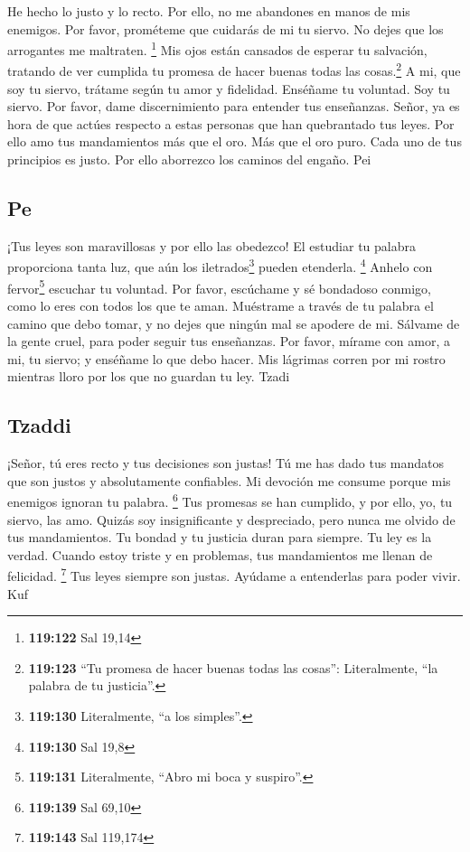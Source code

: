  He hecho lo justo y lo recto. Por ello, no me abandones
en manos de mis enemigos.  Por favor, prométeme que
cuidarás de mi tu siervo. No dejes que los arrogantes me maltraten.
\footnote{\textbf{119:122} Sal 19,14}  Mis ojos están
cansados de esperar tu salvación, tratando de ver cumplida tu promesa de
hacer buenas todas las cosas.\footnote{\textbf{119:123} ``Tu promesa de
  hacer buenas todas las cosas'': Literalmente, ``la palabra de tu
  justicia''.}  A mi, que soy tu siervo, trátame según
tu amor y fidelidad. Enséñame tu voluntad.  Soy tu
siervo. Por favor, dame discernimiento para entender tus enseñanzas.
 Señor, ya es hora de que actúes respecto a estas
personas que han quebrantado tus leyes.  Por ello amo
tus mandamientos más que el oro. Más que el oro puro. 
Cada uno de tus principios es justo. Por ello aborrezco los caminos del
engaño. Pei

\hypertarget{pe}{%
\subsection{Pe}\label{pe}}

 ¡Tus leyes son maravillosas y por ello las obedezco!
 El estudiar tu palabra proporciona tanta luz, que aún
los iletrados\footnote{\textbf{119:130} Literalmente, ``a los simples''.}
pueden etenderla. \footnote{\textbf{119:130} Sal 19,8} 
Anhelo con fervor\footnote{\textbf{119:131} Literalmente, ``Abro mi boca
  y suspiro''.} escuchar tu voluntad.  Por favor,
escúchame y sé bondadoso conmigo, como lo eres con todos los que te
aman.  Muéstrame a través de tu palabra el camino que
debo tomar, y no dejes que ningún mal se apodere de mi. 
Sálvame de la gente cruel, para poder seguir tus enseñanzas.
 Por favor, mírame con amor, a mi, tu siervo; y enséñame
lo que debo hacer.  Mis lágrimas corren por mi rostro
mientras lloro por los que no guardan tu ley. Tzadi

\hypertarget{tzaddi}{%
\subsection{Tzaddi}\label{tzaddi}}

 ¡Señor, tú eres recto y tus decisiones son justas!
 Tú me has dado tus mandatos que son justos y
absolutamente confiables.  Mi devoción me consume porque
mis enemigos ignoran tu palabra. \footnote{\textbf{119:139} Sal 69,10}
 Tus promesas se han cumplido, y por ello, yo, tu
siervo, las amo.  Quizás soy insignificante y
despreciado, pero nunca me olvido de tus mandamientos. 
Tu bondad y tu justicia duran para siempre. Tu ley es la verdad.
 Cuando estoy triste y en problemas, tus mandamientos me
llenan de felicidad. \footnote{\textbf{119:143} Sal 119,174}
 Tus leyes siempre son justas. Ayúdame a entenderlas
para poder vivir. Kuf

